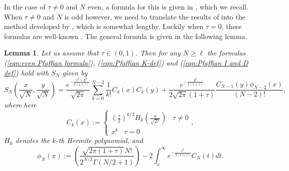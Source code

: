 \documentclass[12pt]{article}
\newtheorem{lem}[info]{Lemma}
\numberwithin{info}{section}
\numberwithin{equation}{section}
\renewcommand{\[}{\begin{equation}}
\renewcommand{\]}{\end{equation}}
\newcommand{\sq}{\sqrt}
\newcommand{\<}{\langle}
\renewcommand{\>}{\rangle}
\renewcommand{\sq}{\sqrt}
\begin{document}
	In the case of $\tau\neq 0$ and $N$ even, a formula for this is given in \cite{forrester-elliptic}, which we recall. When $\tau\neq 0$ and $N$ is odd however, we need to translate the results of \cite{forrester-elliptic} into the method developed by \cite{sinclair}, which is somewhat lengthy. Luckily when $\tau=0$, these formulas are well-known \cite{borodin-elliptic,ginibre-odd}. The general formula is given in the following lemma.
	
	\begin{lem}
		\label{lem:exact form of pfaffian kernel}
		Let us assume that $\tau\in (0,1)$. Then for any $N\ge \ell$ the formulas (\ref{eqn:even Pfaffian formula}), (\ref{eqn:Pfaffian K-def}) and  (\ref{eqn:Pfaffian I and D def}) hold with $S_N$ given by
		\[S_N\left(\frac{x}{\sqrt{N}},\frac{y}{\sqrt{N}}\right)=\frac{e^{-\frac{x^2+y^2}{2(1+\tau)}}}{\sq{2\pi}}\sum_{k=0}^{N-2}\frac{1}{k!}C_k(x)C_k(y)+\frac{e^{-\frac{y^2}{2(1+\tau)}}}{2\sq{2\pi}(1+\tau)}\frac{C_{N-1}(y)\phi_{N-2}(x)}{(N-2)!},\label{eqn:S-definition}\]
		where here
		\[C_k(x):=
		\begin{cases}
			\left(\frac{\tau}{2}\right)^{k/2}H_k \left(\frac{x}{\sq{2\tau}}\right)\;\;\; \tau\neq 0\\
			x^k\;\;\; \tau=0
		\end{cases}	
		,\]
		$H_k$ denotes the $k$-th Hermite polynomial, and
		\[\phi_N(x):=\left(\frac{\sq{2\pi(1+\tau)}N!}{2^{N/2}\Gamma(N/2+1)}\right)-2\int_{x}^\infty e^{-\frac{t^2}{2(1+\tau)}}C_N(t)dt.\label{eqn:ignore-phi-def}\]
	\end{lem}
\end{document}
